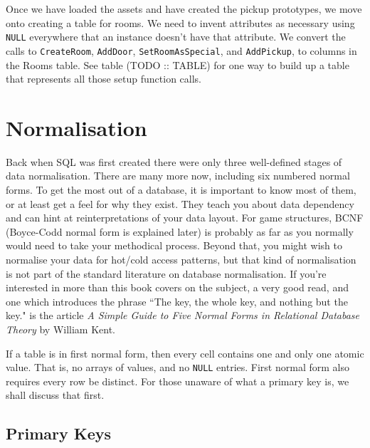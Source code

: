 \documentclass[a4paper,12pt]{article}
\begin{document}
Once we have loaded the assets and have created the pickup prototypes, we move onto creating a table for rooms.
We need to invent attributes as necessary using \texttt{NULL} everywhere that an instance doesn't have that attribute.
We convert the calls to \texttt{CreateRoom}, \texttt{AddDoor}, \texttt{SetRoomAsSpecial}, and \texttt{AddPickup}, to columns in the Rooms table.
See table (TODO :: TABLE) for one way to build up a table that represents all those setup function calls.

\newpage
\section{Normalisation}

Back when SQL was first created there were only three well-defined stages of data normalisation.
There are many more now, including six numbered normal forms.
To get the most out of a database, it is important to know most of them, or at least get a feel for why they exist.
They teach you about data dependency and can hint at reinterpretations of your data layout.
For game structures, BCNF (Boyce-Codd normal form is explained later) is probably as far as you normally would need to take your methodical process.
Beyond that, you might wish to normalise your data for hot/cold access patterns, but that kind of normalisation is not part of the standard literature on database normalisation.
If you're interested in more than this book covers on the subject, a very good read, and one which introduces the phrase ``The key, the whole key, and nothing but the key." is the article \textit{A Simple Guide to Five Normal Forms in Relational Database Theory} by William Kent.

If a table is in first normal form, then every cell contains one and only one atomic value.
That is, no arrays of values, and no \texttt{NULL} entries.
First normal form also requires every row be distinct.
For those unaware of what a primary key is, we shall discuss that first.

\subsection{Primary Keys}
\end{document}
